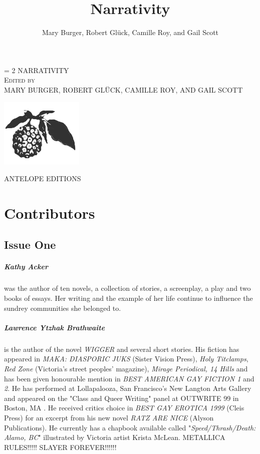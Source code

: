 \documentclass[
]{memoir}
\title{Narrativity}
\author{Mary Burger, Robert Glück, Camille Roy, and Gail Scott}
\date{}
\newlength{\drop}%
\newcommand*{\titleWH}{\begingroup%
\drop = 2\baselineskip
\centering
\vspace*{\drop}
\settowidth{\unitlength}{\Huge\uppercase{Narrativity}}
\vspace*{\baselineskip}
{\Huge\color{red} \uppercase{Narrativity}}\\[\drop]
{\Large\scshape Edited by}\\[\drop]
{\Large\uppercase{Mary Burger, Robert Glück, Camille Roy, and Gail Scott}}\\[\baselineskip]
\vspace*{\drop}
\begin{center} \includegraphics{images/pandanus.png} \end{center}
\vspace*{\drop}
{\Large ANTELOPE EDITIONS}\\
{\scshape \the\year{}}\par
\vspace*{\drop}
\endgroup}
\begin{document}
\titleWH


\frontmatter


\setcounter{tocdepth}{0}
\tableofcontents



\hypertarget{contributors}{%
\chapter{Contributors}\label{contributors}}

\hypertarget{issue-one}{%
\section*{Issue One}\label{issue-one}}

\hypertarget{kathy-acker}{%
\paragraph{Kathy Acker}\label{kathy-acker}}

was the author of ten novels, a collection of stories, a screenplay, a
play and two books of essays. Her writing and the example of her life
continue to influence the sundrey communities she belonged to.

\hypertarget{lawrence-ytzhak-brathwaite}{%
\paragraph{Lawrence Ytzhak
Brathwaite}\label{lawrence-ytzhak-brathwaite}}

is the author of the novel \emph{WIGGER} and several short stories. His
fiction has appeared in \emph{MAKA: DIASPORIC JUKS} (Sister Vision
Press), \emph{Holy Titclamps}, \emph{Red Zone} (Victoria's street
peoples' magazine), \emph{Mirage Periodical, 14 Hills} and has been
given honourable mention in \emph{BEST AMERICAN GAY FICTION 1} and
\emph{2}. He has performed at Lollapalooza, San Francisco's New Langton
Arts Gallery and appeared on the "Class and Queer Writing" panel at
OUTWRITE 99 in Boston, MA . He received critics choice in \emph{BEST GAY
EROTICA 1999} (Cleis Press) for an excerpt from his new novel \emph{RATZ
ARE NICE} (Alyson Publications). He currently has a chapbook available
called "\emph{Speed/Thrash/Death: Alamo, BC}" illustrated by Victoria
artist Krista McLean. METALLICA RULES!!!!! SLAYER FOREVER!!!!!!
\end{document}
